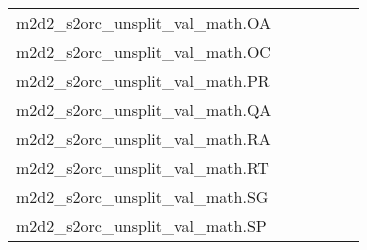 {\begin{longtable}{m{6cm}m{1.7cm}m{1.7cm}m{1.7cm}m{1.7cm}m{1.7cm}}
	m2d2\_s2orc\_unsplit\_val\_math.OA  & \colorbox[HTML]{77c578}{\makebox[\mywidth][c]{7.21}} & \colorbox[HTML]{e9f6af}{\makebox[\mywidth][c]{7.55}} & \colorbox[HTML]{ffffe5}{\makebox[\mywidth][c]{9.07}} & \colorbox[HTML]{ddf1a6}{\makebox[\mywidth][c]{7.47}} & \colorbox[HTML]{b2df90}{\makebox[\mywidth][c]{7.32}}\\
	m2d2\_s2orc\_unsplit\_val\_math.OC  & \colorbox[HTML]{7fc97b}{\makebox[\mywidth][c]{9.70}} & \colorbox[HTML]{e4f4ab}{\makebox[\mywidth][c]{10.01}} & \colorbox[HTML]{ffffe5}{\makebox[\mywidth][c]{11.62}} & \colorbox[HTML]{bfe596}{\makebox[\mywidth][c]{9.85}} & \colorbox[HTML]{77c578}{\makebox[\mywidth][c]{9.69}}\\
	m2d2\_s2orc\_unsplit\_val\_math.PR  & \colorbox[HTML]{77c578}{\makebox[\mywidth][c]{8.91}} & \colorbox[HTML]{e7f5ad}{\makebox[\mywidth][c]{9.20}} & \colorbox[HTML]{ffffe5}{\makebox[\mywidth][c]{10.58}} & \colorbox[HTML]{bde395}{\makebox[\mywidth][c]{9.04}} & \colorbox[HTML]{a5d98b}{\makebox[\mywidth][c]{8.99}}\\
	m2d2\_s2orc\_unsplit\_val\_math.QA  & \colorbox[HTML]{77c578}{\makebox[\mywidth][c]{8.09}} & \colorbox[HTML]{e5f5ac}{\makebox[\mywidth][c]{8.40}} & \colorbox[HTML]{ffffe5}{\makebox[\mywidth][c]{9.93}} & \colorbox[HTML]{ccea9c}{\makebox[\mywidth][c]{8.28}} & \colorbox[HTML]{9bd587}{\makebox[\mywidth][c]{8.16}}\\
	m2d2\_s2orc\_unsplit\_val\_math.RA  & \colorbox[HTML]{77c578}{\makebox[\mywidth][c]{7.18}} & \colorbox[HTML]{e5f4ab}{\makebox[\mywidth][c]{7.44}} & \colorbox[HTML]{ffffe5}{\makebox[\mywidth][c]{8.75}} & \colorbox[HTML]{daf0a4}{\makebox[\mywidth][c]{7.39}} & \colorbox[HTML]{addd8e}{\makebox[\mywidth][c]{7.27}}\\
	m2d2\_s2orc\_unsplit\_val\_math.RT  & \colorbox[HTML]{77c578}{\makebox[\mywidth][c]{8.39}} & \colorbox[HTML]{e4f4ab}{\makebox[\mywidth][c]{8.71}} & \colorbox[HTML]{ffffe5}{\makebox[\mywidth][c]{10.33}} & \colorbox[HTML]{d9f0a3}{\makebox[\mywidth][c]{8.65}} & \colorbox[HTML]{a7da8b}{\makebox[\mywidth][c]{8.49}}\\
	m2d2\_s2orc\_unsplit\_val\_math.SG  & \colorbox[HTML]{8bce80}{\makebox[\mywidth][c]{8.63}} & \colorbox[HTML]{e4f4ab}{\makebox[\mywidth][c]{8.88}} & \colorbox[HTML]{ffffe5}{\makebox[\mywidth][c]{10.36}} & \colorbox[HTML]{c8e89a}{\makebox[\mywidth][c]{8.76}} & \colorbox[HTML]{77c578}{\makebox[\mywidth][c]{8.59}}\\
	m2d2\_s2orc\_unsplit\_val\_math.SP  & \colorbox[HTML]{86cc7e}{\makebox[\mywidth][c]{9.39}} & \colorbox[HTML]{def2a6}{\makebox[\mywidth][c]{9.65}} & \colorbox[HTML]{ffffe5}{\makebox[\mywidth][c]{11.27}} & \colorbox[HTML]{bbe395}{\makebox[\mywidth][c]{9.52}} & \colorbox[HTML]{77c578}{\makebox[\mywidth][c]{9.37}}\\

\end{longtable}}
